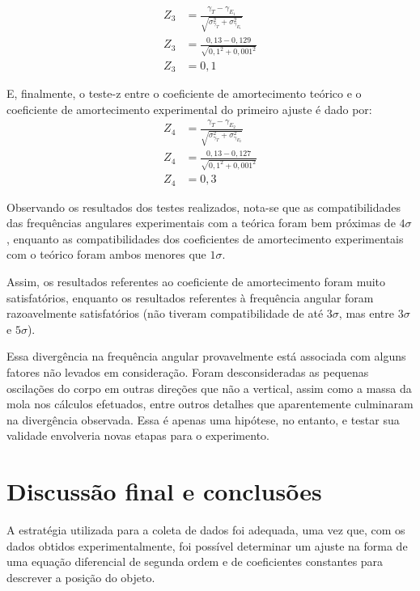 \documentclass[12pt]{article}
\begin{document}
		\begin{align}
			Z_3 &= \frac{\gamma_T - \gamma_{E_1}}{\sqrt{\sigma_{\gamma_T}^2+\sigma_{\gamma_{E_1}}^2}} \nonumber \\
			Z_3 &= \frac{0,13 - 0,129}{\sqrt{0,1^2+0,001^2}} \nonumber \\
			Z_3 &= 0,1 \nonumber
		\end{align}		
		
		E, finalmente, o teste-z entre o coeficiente de amortecimento teórico e o coeficiente de amortecimento experimental do primeiro ajuste é dado por:
		\begin{align}
			Z_4 &= \frac{\gamma_T - \gamma_{E_2}}{\sqrt{\sigma_{\gamma_T}^2+\sigma_{\gamma_{E_2}}^2}} \nonumber \\
			Z_4 &= \frac{0,13 - 0,127}{\sqrt{0,1^2+0,001^2}} \nonumber \\
			Z_4 &= 0,3 \nonumber
		\end{align}
		
		Observando os resultados dos testes realizados, nota-se que as compatibilidades das frequências angulares experimentais com a teórica foram bem próximas de $4\sigma$, enquanto as compatibilidades dos coeficientes de amortecimento experimentais com o teórico foram ambos menores que $1\sigma$.
		
		Assim, os resultados referentes ao coeficiente de amortecimento foram muito satisfatórios, enquanto os resultados referentes à frequência angular foram razoavelmente satisfatórios (não tiveram compatibilidade de até $3\sigma$, mas entre $3\sigma$ e $5\sigma$).
		
		Essa divergência na frequência angular provavelmente está associada com alguns fatores não levados em consideração. Foram desconsideradas as pequenas oscilações do corpo em outras direções que não a vertical, assim como a massa da mola nos cálculos efetuados, entre outros detalhes que aparentemente culminaram na divergência observada. Essa é apenas uma hipótese, no entanto, e testar sua validade envolveria novas etapas para o experimento.
		
							
	
	\section*{Discussão final e conclusões}
		A estratégia utilizada para a coleta de dados foi adequada, uma vez que, com os dados obtidos experimentalmente, foi possível determinar um ajuste na forma de uma equação diferencial de segunda ordem e de coeficientes constantes para descrever a posição do objeto. 
		
\end{document}
